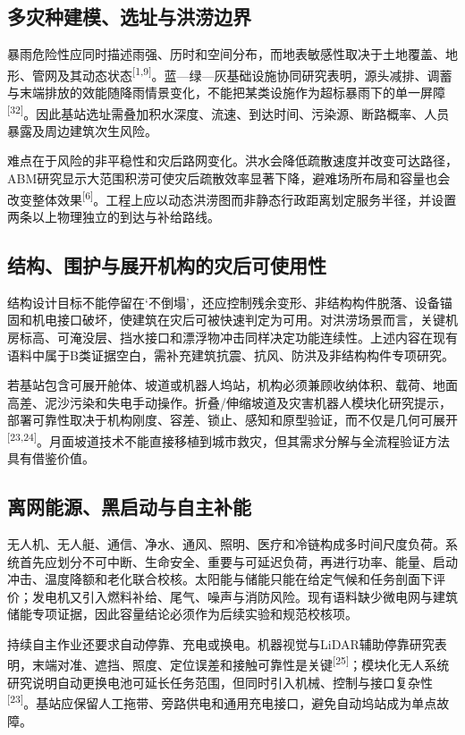 \documentclass[UTF8,a4paper,zihao=-4]{ctexart}
\begin{document}
\subsection{多灾种建模、选址与洪涝边界}

暴雨危险性应同时描述雨强、历时和空间分布，而地表敏感性取决于土地覆盖、地形、管网及其动态状态\textsuperscript{[1,9]}。蓝—绿—灰基础设施协同研究表明，源头减排、调蓄与末端排放的效能随降雨情景变化，不能把某类设施作为超标暴雨下的单一屏障\textsuperscript{[32]}。因此基站选址需叠加积水深度、流速、到达时间、污染源、断路概率、人员暴露及周边建筑次生风险。

难点在于风险的非平稳性和灾后路网变化。洪水会降低疏散速度并改变可达路径，ABM研究显示大范围积涝可使灾后疏散效率显著下降，避难场所布局和容量也会改变整体效果\textsuperscript{[6]}。工程上应以动态洪涝图而非静态行政距离划定服务半径，并设置两条以上物理独立的到达与补给路线。

\subsection{结构、围护与展开机构的灾后可使用性}

结构设计目标不能停留在‘不倒塌’，还应控制残余变形、非结构构件脱落、设备锚固和机电接口破坏，使建筑在灾后可被快速判定为可用。对洪涝场景而言，关键机房标高、可淹没层、挡水接口和漂浮物冲击同样决定功能连续性。上述内容在现有语料中属于B类证据空白，需补充建筑抗震、抗风、防洪及非结构构件专项研究。

若基站包含可展开舱体、坡道或机器人坞站，机构必须兼顾收纳体积、载荷、地面高差、泥沙污染和失电手动操作。折叠/伸缩坡道及灾害机器人模块化研究提示，部署可靠性取决于机构刚度、容差、锁止、感知和原型验证，而不仅是几何可展开\textsuperscript{[23,24]}。月面坡道技术不能直接移植到城市救灾，但其需求分解与全流程验证方法具有借鉴价值。

\subsection{离网能源、黑启动与自主补能}

无人机、无人艇、通信、净水、通风、照明、医疗和冷链构成多时间尺度负荷。系统首先应划分不可中断、生命安全、重要与可延迟负荷，再进行功率、能量、启动冲击、温度降额和老化联合校核。太阳能与储能只能在给定气候和任务剖面下评价；发电机又引入燃料补给、尾气、噪声与消防风险。现有语料缺少微电网与建筑储能专项证据，因此容量结论必须作为后续实验和规范校核项。

持续自主作业还要求自动停靠、充电或换电。机器视觉与LiDAR辅助停靠研究表明，末端对准、遮挡、照度、定位误差和接触可靠性是关键\textsuperscript{[25]}；模块化无人系统研究说明自动更换电池可延长任务范围，但同时引入机械、控制与接口复杂性\textsuperscript{[23]}。基站应保留人工拖带、旁路供电和通用充电接口，避免自动坞站成为单点故障。
\end{document}

